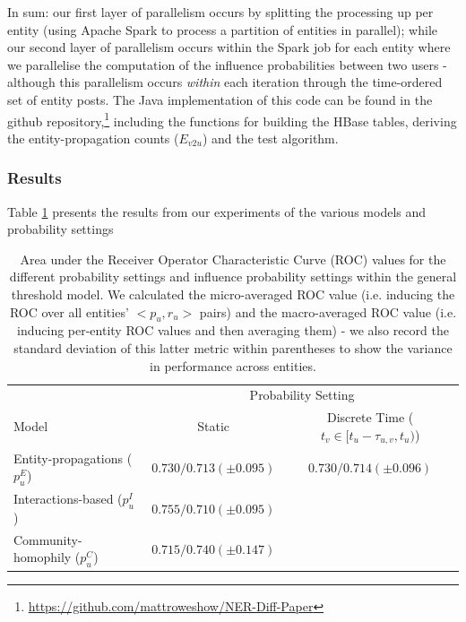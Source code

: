 \documentclass[journal,10pt,draftclsnofoot,onecolumn]{IEEEtran}
\begin{document}
In sum: our first layer of parallelism occurs by splitting the processing up per entity (using Apache Spark to process a partition of entities in parallel); while our second layer of parallelism occurs within the Spark job for each entity where we parallelise the computation of the influence probabilities between two users - although this parallelism occurs \emph{within} each iteration through the time-ordered set of entity posts.
The Java implementation of this code can be found in the github repository,\footnote{\url{https://github.com/mattroweshow/NER-Diff-Paper}} including the functions for building the HBase tables, deriving the entity-propagation counts ($E_{v2u}$) and the test algorithm.

\subsubsection{Results}
Table \ref{tab:macro_results} presents the results from our experiments of the various models and probability settings


\begin{table}
\begin{center}
\caption{Area under the Receiver Operator Characteristic Curve (ROC) values for the different probability settings and influence probability settings within the general threshold model. 
We calculated the micro-averaged ROC value (i.e. inducing the ROC over all entities' $<p_u, r_u>$ pairs) and the macro-averaged ROC value (i.e. inducing per-entity ROC values and then averaging them) - we also record the standard deviation of this latter metric within parentheses to show the variance in performance across entities. }
\begin{tabular}{ l | c c}
\hline
& \multicolumn{2}{c}{Probability Setting} \\
Model & Static & Discrete Time ($t_v \in [t_u - \tau_{u,v}, t_u)$) \\
\hline
Entity-propagations ($p_{u}^{E}$)  & $0.730 / 0.713(\pm0.095)$ & $0.730 / 0.714 (\pm0.096)$ \\
Interactions-based ($p_{u}^{I}$) & $0.755 / 0.710(\pm0.095)$ & \\
Community-homophily ($p_{u}^{C}$) & $0.715 / 0.740(\pm0.147)$ & \\
\hline
\end{tabular}
\label{tab:macro_results}
\end{center}
\end{table}
\end{document}
